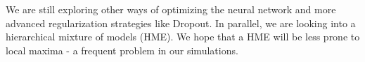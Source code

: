 \documentclass[a0,landscape]{a0poster}
\begin{document}
\begin{multicols}{4}
We are still exploring other ways of optimizing the neural network and more advanced regularization strategies like Dropout. In parallel, we are looking into a hierarchical mixture of models (HME). We hope that a HME will be less prone to local maxima - a frequent problem in our simulations.


\nocite{*}




\end{multicols}
\end{document}
